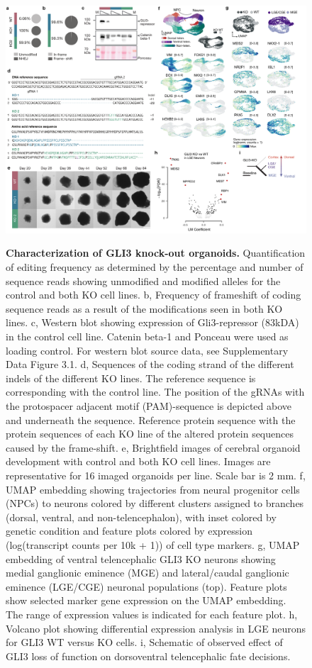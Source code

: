 \begin{figure}[h!]
    \centering
	\includegraphics[width=\textwidth]{figures/pando/Figure_S9}
    \label{fig:regS9}
    \caption{\textbf{Characterization of GLI3 knock-out organoids.} Quantification of editing frequency as determined by the percentage and number of sequence reads showing unmodified and modified alleles for the control and both KO cell lines. b, Frequency of frameshift of coding sequence reads as a result of the modifications seen in both KO lines. c, Western blot showing expression of Gli3-repressor (83kDA) in the control cell line. Catenin beta-1 and Ponceau were used as loading control. For western blot source data, see Supplementary Data Figure 3.1. d, Sequences of the coding strand of the different indels of the different KO lines. The reference sequence is corresponding with the control line. The position of the gRNAs with the protospacer adjacent motif (PAM)-sequence is depicted above and underneath the sequence. Reference protein sequence with the protein sequences of each KO line of the altered protein sequences caused by the frame-shift. e, Brightfield images of cerebral organoid development with control and both KO cell lines. Images are representative for 16 imaged organoids per line. Scale bar is 2 mm. f, UMAP embedding showing trajectories from neural progenitor cells (NPCs) to neurons colored by different clusters assigned to branches (dorsal, ventral, and non-telencephalon), with inset colored by genetic condition and feature plots colored by expression (log(transcript counts per 10k + 1)) of cell type markers. g, UMAP embedding of ventral telencephalic GLI3 KO neurons showing medial ganglionic eminence (MGE) and lateral/caudal ganglionic eminence (LGE/CGE) neuronal populations (top). Feature plots show selected marker gene expression on the UMAP embedding. The range of expression values is indicated for each feature plot. h, Volcano plot showing differential expression analysis in LGE neurons for GLI3 WT versus KO cells. i, Schematic of observed effect of GLI3 loss of function on dorsoventral telencephalic fate decisions. }
\end{figure}


